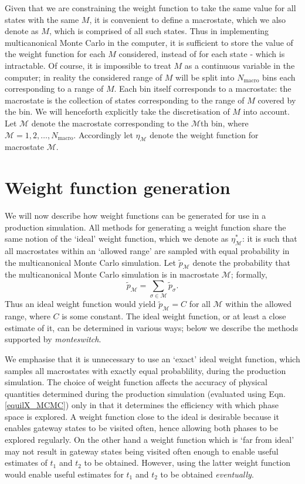 \documentclass{report}
\begin{document}
Given that we are constraining the weight function to take the same value for all states with the same $M$, it is convenient to define a
macrostate, which we also denote as $M$, which is comprised of all such states. Thus in implementing multicanonical Monte Carlo
in the computer, it is sufficient to store the value of the weight function for each $M$ considered, instead of for each state - which is
intractable. Of course, it is impossible to treat $M$ as a continuous variable in the computer; in reality the considered range of $M$ will
be split into $N_{\text{macro}}$ bins each corresponding to a range of $M$. Each bin itself corresponds to a macrostate: the macrostate is the
collection of states corresponding to the range of $M$ covered by the bin. We will henceforth explicitly take the discretisation of $M$ into
account. Let $\mathcal{M}$ denote the macrostate corresponding to the $\mathcal{M}$th bin, where $\mathcal{M}=1,2,\dotsc,N_{\text{macro}}$.
Accordingly let $\eta_{\mathcal{M}}$ denote the weight function for macrostate $\mathcal{M}$.

\section{Weight function generation}
We will now describe how weight functions can be generated for use in a production simulation.
All methods for generating a weight function share the same notion of the `ideal' weight function, which we denote as $\eta_{\mathcal{M}}^*$: 
it is such that all macrostates within an `allowed range' are sampled with equal probability in the multicanonical Monte Carlo simulation. 
Let $\tilde{p}_{\mathcal{M}}$ denote the probability that the multicanonical Monte Carlo simulation is in macrostate $\mathcal{M}$; formally,
\begin{equation}
\tilde{p}_{\mathcal{M}}=\sum_{\sigma\in\mathcal{M}}\tilde{p}_{\sigma}.
\end{equation}
Thus an ideal weight function would yield $\tilde{p}_{\mathcal{M}}=C$ for all $\mathcal{M}$ within the allowed range, where $C$ is some constant.
The ideal weight function, or at least a close estimate of it, can be determined in various ways; below we describe the methods supported by 
\emph{monteswitch}. 

We emphasise that it is unnecessary to use an `exact' ideal weight function, which samples all macrostates with exactly equal probablility, during the
production simulation. The choice of weight function affects the accuracy of physical quantities determined during the production simulation
(evaluated using Eqn. \eqref{equilX_MCMC}) only in that it determines the efficiency with which phase space is explored. A weight function close
to the ideal is desirable because it enables gateway states to be visited often, hence allowing both phases to be explored regularly. On the
other hand a weight function which is `far from ideal' may not result in gateway states being visited often enough to enable useful estimates
of $t_1$ and $t_2$ to be obtained. However, using the latter weight function would enable useful estimates for $t_1$ and $t_2$ to be obtained
\emph{eventually}.
\end{document}
